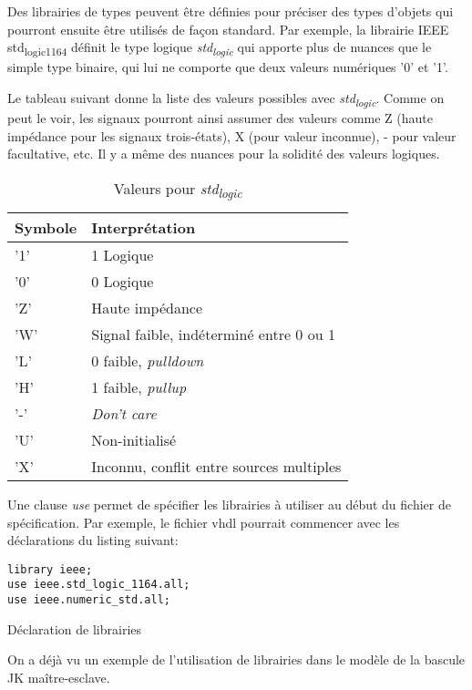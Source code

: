 \documentclass[11pt]{article}
\begin{document}
Des librairies de types peuvent être définies pour préciser des types
d'objets qui pourront ensuite être utilisés de façon standard. Par
exemple, la librairie IEEE std\textsubscript{logic}\textsubscript{1164} définit le type logique
\emph{std\textsubscript{logic}} qui apporte plus de nuances que le simple type binaire,
qui lui ne comporte que deux valeurs numériques '0' et '1'.

Le tableau suivant donne la liste des valeurs possibles avec
\emph{std\textsubscript{logic}}. Comme on peut le voir, les signaux pourront ainsi assumer
des valeurs comme Z (haute impédance pour les signaux trois-états), X
(pour valeur inconnue), - pour valeur facultative, etc. Il y a même
des nuances pour la solidité des valeurs logiques.

\begin{table}[htbp]
\caption{\label{tab:org0d77fe9}Valeurs pour \emph{std\textsubscript{logic}}}
\centering
\begin{tabular}{ll}
Symbole & Interprétation\\
\hline
'1' & 1 Logique\\
'0’ & 0 Logique\\
'Z' & Haute impédance\\
'W' & Signal faible, indéterminé entre 0 ou 1\\
'L' & 0 faible, \emph{pulldown}\\
'H' & 1 faible, \emph{pullup}\\
'-' & \emph{Don't care}\\
'U' & Non-initialisé\\
'X' & Inconnu, conflit entre sources multiples\\
\end{tabular}
\end{table}

Une clause \emph{use} permet de spécifier les librairies à utiliser au
début du fichier de spécification. Par exemple, le fichier vhdl
pourrait commencer avec les déclarations du listing suivant:

\begin{listing}[htbp]
\begin{verbatim}
library ieee;
use ieee.std_logic_1164.all;
use ieee.numeric_std.all;
\end{verbatim}
\caption{Déclaration de librairies}
\end{listing}

On a déjà vu un exemple de l'utilisation de librairies dans le modèle
de la bascule JK maître-esclave.
\end{document}
